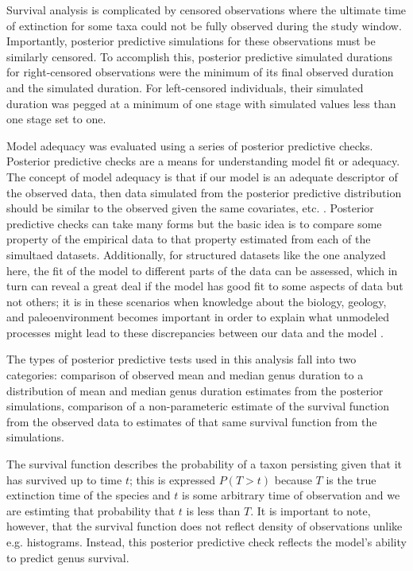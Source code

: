\documentclass[11pt]{article}
\begin{document}
Survival analysis is complicated by censored observations where the ultimate time of extinction for some taxa could not be fully observed during the study window. Importantly, posterior predictive simulations for these observations must be similarly censored. To accomplish this, posterior predictive simulated durations for right-censored observations were the minimum of its final observed duration and the simulated duration. For left-censored individuals, their simulated duration was pegged at a minimum of one stage with simulated values less than one stage set to one.

Model adequacy was evaluated using a series of posterior predictive checks. Posterior predictive checks are a means for understanding model fit or adequacy. The concept of model adequacy is that if our model is an adequate descriptor of the observed data, then data simulated from the posterior predictive distribution should be similar to the observed given the same covariates, etc. \citep{Gelman2013d}. Posterior predictive checks can take many forms but the basic idea is to compare some property of the empirical data to that property estimated from each of the simultaed datasets. Additionally, for structured datasets like the one analyzed here, the fit of the model to different parts of the data can be assessed, which in turn can reveal a great deal if the model has good fit to some aspects of data but not others; it is in these scenarios when knowledge about the biology, geology, and paleoenvironment becomes important in order to explain what unmodeled processes might lead to these discrepancies between our data and the model \citep{Gelman2013d}.

The types of posterior predictive tests used in this analysis fall into two categories: comparison of observed mean and median genus duration to a distribution of mean and median genus duration estimates from the posterior simulations, comparison of a non-parameteric estimate of the survival function from the observed data to estimates of that same survival function from the simulations. 

The survival function describes the probability of a taxon persisting given that it has survived up to time \(t\); this is expressed \(P(T > t)\) because \(T\) is the true extinction time of the species and \(t\) is some arbitrary time of observation and we are estimting that probability that \(t\) is less than \(T\). It is important to note, however, that the survival function does not reflect density of observations unlike e.g. histograms. Instead, this posterior predictive check reflects the model's ability to predict genus survival.
\end{document}
